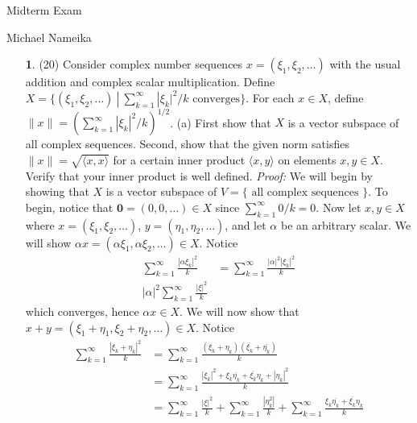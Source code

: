 \documentclass{article}
\begin{document}
\begin{center}
    {\Huge Midterm Exam}
    \vspace{0.5cm}

    {\Large Michael Nameika}
\end{center}
\begin{itemize}
    \item[\textbf{1}.] (20) Consider complex number sequences $x = (\xi_1, \xi_2, \dots)$ with the usual addition and complex scalar multiplication. Define $X = \{(\xi_1, \xi_2, \dots) \: | \: \sum_{k=1}^{\infty} |\xi_k|^2/k \text{  converges}\}$. For each $x \in X$, define $\|x\| = (\sum_{k = 1}^{\infty}|\xi_k|^2/k)^{1/2}$. 
    \newline\newline
    (a) First show that $X$ is a vector subspace of all complex sequences. Second, show that the given norm satisfies $\|x\| = \sqrt{\langle x, x\rangle}$ for a certain inner product $\langle x, y \rangle$ on elements $x,y \in X$. Verify that your inner product is well defined. 
    \newline\newline
    \textit{Proof:} We will begin by showing that $X$ is a vector subspace of $V = \{\text{ all complex sequences }\}$. To begin, notice that $\mathbf{0} = (0,0, \dots) \in X$ since $\sum_{k=1}^{\infty} 0/k = 0$. Now let $x,y\in X$ where $x = (\xi_1, \xi_2, \dots)$, $y = (\eta_1, \eta_2, \dots)$, and let $\alpha$ be an arbitrary scalar. We will show $\alpha x = (\alpha\xi_1, \alpha \xi_2, \dots) \in X$. Notice
    \begin{align*}
        \sum_{k = 1}^{\infty} \frac{|\alpha\xi_k|^2}{k} &= \sum_{k = 1}^{\infty} \frac{|\alpha|^2|\xi_k|^2}{k}\\
        |\alpha|^2 \sum_{k = 1}^{\infty} \frac{|\xi|^2}{k}
    \end{align*}
    which converges, hence $\alpha x \in X$. We will now show that $x + y = (\xi_1 + \eta_1, \xi_2 + \eta_2, \dots) \in X$. Notice
    \begin{align*}
        \sum_{k = 1}^{\infty}\frac{|\xi_k + \eta_k|^2}{k} &= \sum_{k = 1}^{\infty} \frac{(\xi_k + \eta_k)(\overline{\xi_k} + \overline{\eta_k})}{k}\\
        &= \sum_{k = 1}^{\infty} \frac{|\xi_k|^2 + \xi_k\overline{\eta_k} + \overline{\xi_k}\eta_k + |\eta_k|^2}{k}\\
        &= \sum_{k = 1}^{\infty} \frac{|\xi|^2}{k} + \sum_{k = 1}^{\infty} \frac{|\eta_k^2|}{k} + \sum_{k = 1}^{\infty} \frac{\xi_k\overline{\eta_k} + \overline{\xi_k}\eta_k}{k}

\end{align*}
\end{itemize}
\end{document}
